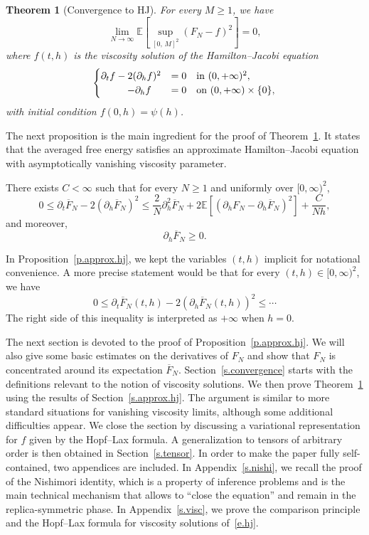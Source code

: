 \documentclass[10pt]{amsart}
\newtheorem{theo}{Theorem}[section]
\theoremstyle{definition}\newtheorem{defi}[theo]{Definition}\newtheorem{rema}[theo]{Remark}\newtheorem{exam}[theo]{Example}\newtheorem{exem}[theo]{Example}\newtheorem{nota}[theo]{Notation}
\newcommand{\E}{\mathbb{E}}
\newcommand{\1}{\mathds{1}}
\renewcommand{\le}{\leqslant}
\renewcommand{\ge}{\geqslant}
\renewcommand{\bar}{\overline}
\begin{document}
\begin{theo}[Convergence to HJ]\label{t.hj}
For every $M \ge 1$, we have
\[
\lim_{N\to \infty} \E \left[\sup_{\left[0,\,M\right]^2} \left(F_N - f\right)^2 \right] = 0,
\]
where $f(t,h)$ is the viscosity solution of the Hamilton--Jacobi equation
\begin{equation}\label{e.hj}
\begin{cases}
\partial_t f - 2(\partial_{h} f)^2  &= 0 \quad  \text{in } (0,+\infty)^2, \\
\mkern48mu- \partial_h f & = 0 \quad  \text{on } (0,+\infty) \times \{0\},
\end{cases}
\end{equation}
with initial condition $f(0,h) = \psi(h)$.
\end{theo}
The next proposition is the main ingredient for the proof of Theorem~\ref{t.hj}. It states that the averaged free energy satisfies an approximate Hamilton--Jacobi equation with asymptotically vanishing viscosity parameter.
\begin{prop}
There exists $C < \infty$ such that for every $N \ge 1$ and uniformly over $[0,\infty)^2$,\label{p.approx.hj}
\[
0 \le \partial_t \bar F_N - 2\left(\partial_{h} \bar F_N\right)^2 \le \frac 2 {N} \partial_{h}^2 \bar F_N + 2 \E \left[\left(\partial_h F_N - \partial_h \bar F_N\right)^2 \right] +\frac{C}{Nh},
\]
and moreover,
\begin{equation}\label{e.boundary}
\partial_h \bar F_N\ge 0.
\end{equation}
\end{prop}

In Proposition~\ref{p.approx.hj}, we kept the variables $(t,h)$ implicit for notational convenience. A more precise statement would be that for every $(t,h) \in [0,\infty)^2$, we have
\[
0 \le \partial_t \bar F_N(t,h) - 2 \left(\partial_h\bar F_N(t,h) \right) ^2 \le \cdots
\]
The right side of this inequality is interpreted as $+\infty$ when $h = 0$.

The next section is devoted to the proof of Proposition~\ref{p.approx.hj}. We will also give some basic estimates on the derivatives of $F_N$ and show that $F_N$ is concentrated around its expectation $\bar F_N$. Section~\ref{s.convergence} starts with the definitions relevant to the notion of viscosity solutions. We then prove Theorem~\ref{t.hj} using the results of Section~\ref{s.approx.hj}. The argument is similar to more standard situations for vanishing viscosity limits, although some additional difficulties appear. We close the section by discussing a variational representation for $f$ given by the Hopf--Lax formula. A generalization to tensors of arbitrary order is then obtained in Section~\ref{s.tensor}. In order to make the paper fully self-contained, two appendices are included. In Appendix~\ref{s.nishi}, we recall the proof of the Nishimori identity, which is a property of inference problems and is the main technical mechanism that allows to ``close the equation'' and remain in the replica-symmetric phase. In Appendix~\ref{s.visc}, we prove the comparison principle and the Hopf--Lax formula for viscosity solutions of~\eqref{e.hj}.
\end{document}
